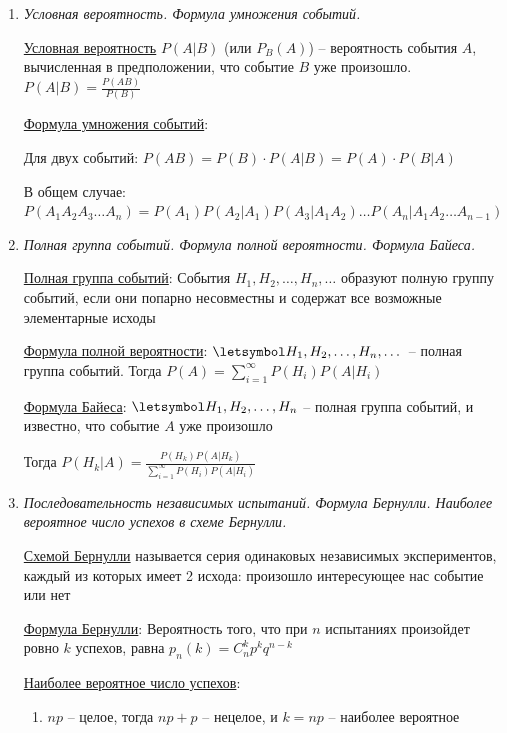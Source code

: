 \begin{enumerate}
    \item \textit{Условная вероятность. Формула умножения событий.}

    \hyperlink{conditionalprobability}{Условная вероятность} $P(A|B)$ (или $P_B(A)$) -- вероятность события $A$, вычисленная в предположении, что событие $B$ уже произошло. $P(A|B) = \frac{P(AB)}{P(B)}$

    \hyperlink{eventsmultiplicationformula}{Формула умножения событий}:

    Для двух событий: $P(AB) = P(B) \cdot P(A|B) = P(A) \cdot P(B|A)$

    В общем случае: $P(A_1 A_2 A_3 \dots A_n) = P(A_1) P(A_2 | A_1) P(A_3 | A_1 A_2) \dots P(A_n | A_1 A_2 \dots A_{n - 1})$

    \item \textit{Полная группа событий. Формула полной вероятности. Формула Байеса.}

    \hyperlink{completegroupofevents}{Полная группа событий}: События $H_1, H_2, \dots, H_n, \dots$ образуют полную группу событий, если они попарно несовместны и содержат все возможные элементарные исходы

    \hyperlink{formulaofcompleteprobability}{Формула полной вероятности}: $\letsymbol H_1, H_2, \dots, H_n, \dots$ -- полная группа событий. Тогда $P(A) = \sum_{i = 1}^\infty P(H_i) P(A | H_i)$
    
    \hyperlink{bayesformula}{Формула Байеса}: $\letsymbol H_1, H_2, \dots, H_n$ -- полная группа событий, и известно, что событие $A$ уже произошло

    Тогда $P(H_k | A) = \frac{P(H_k) P(A | H_k)}{\sum_{i = 1}^\infty P(H_i) P(A | H_i)}$

    \item \textit{Последовательность независимых испытаний. Формула Бернулли. Наиболее вероятное число успехов в схеме Бернулли.}

    \hyperlink{bernoullischema}{Схемой Бернулли} называется серия одинаковых независимых экспериментов, каждый из которых имеет 2 исхода: произошло интересующее нас событие или нет

    \hyperlink{bernoulliformula}{Формула Бернулли}: Вероятность того, что при $n$ испытаниях произойдет ровно $k$ успехов, равна
    $p_n(k) = C_n^k p^k q^{n - k}$

    \hyperlink{themostprobablenumberofsuccesses}{Наиболее вероятное число успехов}: 

    \begin{enumerate}
        \item $np$ -- целое, тогда $np + p$ -- нецелое, и $k = np$ -- наиболее вероятное


\end{enumerate}
\end{enumerate}
